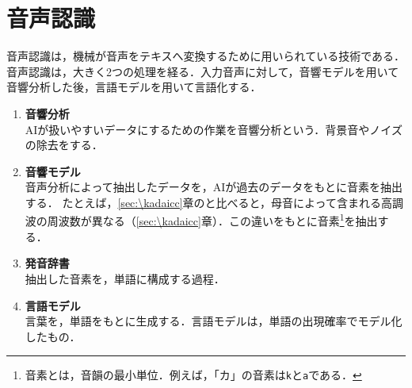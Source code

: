 \section{音声認識}
音声認識は，機械が音声をテキスへ変換するために用いられている技術である．
音声認識は，大きく2つの処理を経る．入力音声に対して，音響モデルを用いて音響分析した後，言語モデルを用いて言語化する．
\begin{enumerate}
    \item \textbf{音響分析}\\
          AIが扱いやすいデータにするための作業を音響分析という．背景音やノイズの除去をする．
    \item \textbf{音響モデル}\\
          音声分析によって抽出したデータを，AIが過去のデータをもとに音素を抽出する．
          たとえば，\ref{sec:\kadaicc}章のと比べると，母音によって含まれる高調波の周波数が異なる（\ref{sec:\kadaicc}章）．この違いをもとに音素\footnote{音素とは，音韻の最小単位．例えば，「カ」の音素は\texttt{k}と\texttt{a}である．}を抽出する．
    \item \textbf{発音辞書}\\
          抽出した音素を，単語に構成する過程．
    \item \textbf{言語モデル}\\
          言葉を，単語をもとに生成する．言語モデルは，単語の出現確率でモデル化したもの．
\end{enumerate}
\begin{flushright}
    \cite{AI音声認識とは}
\end{flushright}
